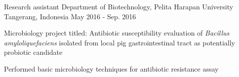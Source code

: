 \begin{cventries}
  \cventry
  {Research assistant} %
  {Department of Biotechnology, Pelita Harapan University} %
  {Tangerang, Indonesia} %
  {May 2016 - Sep. 2016} %
  {
    \begin{cvitems} %
      \item {Microbiology project titled: Antibiotic susceptibility evaluation of \emph{Bacillus amyloliquefaciens} isolated
      from local pig gastrointestinal tract as potentially probiotic candidate}
      \item {Performed basic microbiology techniques for antibiotic resistance assay}
    \end{cvitems}
  }

\end{cventries}
